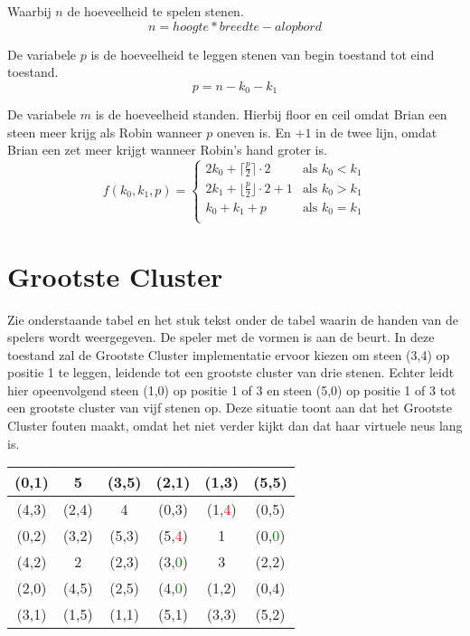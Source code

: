 \documentclass[10pt]{article}
\begin{document}
Waarbij $n$ de hoeveelheid te spelen stenen.
\begin{equation}
    n = hoogte * breedte - alopbord
\end{equation}

De variabele $p$ is de hoeveelheid te leggen stenen van begin toestand tot eind toestand.
\begin{equation}
    p = n - k_0 - k_1
\end{equation}

De variabele $m$ is de hoeveelheid standen. Hierbij floor en ceil omdat Brian een steen meer krijg als Robin wanneer $p$ oneven is. En $+1$ in de twee lijn, omdat Brian een zet meer krijgt wanneer Robin's hand groter is.
\begin{equation}
    f(k_0, k_1, p) = \begin{cases} 
    2k_0 + \lceil \frac{p}{2} \rceil \cdot 2 & \text{als } k_0 < k_1 \\
    2k_1 + \lfloor \frac{p}{2} \rfloor \cdot 2 + 1 & \text{als } k_0 > k_1 \\
    k_0 + k_1 + p & \text{als } k_0 = k_1 \\ 
\end{cases}
\end{equation}

\section{Grootste Cluster}
Zie onderstaande tabel en het stuk tekst onder de tabel waarin de handen van de spelers wordt weergegeven.
De speler met de vormen is aan de beurt.
In deze toestand zal de Grootste Cluster implementatie ervoor kiezen om steen (3,4) op positie 1 te leggen, leidende tot een grootste cluster van drie stenen. 
Echter leidt hier opeenvolgend steen (1,0) op positie 1 of 3 en steen (5,0) op positie 1 of 3 tot een grootste cluster van vijf stenen op.
Deze situatie toont aan dat het Grootste Cluster fouten maakt, omdat het niet verder kijkt dan dat haar virtuele neus lang is.

\FloatBarrier
\begin{tabular}{|c|c|c|c|c|c|}
\hline
(0,1) & 5 & (3,5) & (2,1) & (1,3) & (5,5) \\
\hline
(4,3) & (2,4) & 4 & (0,3) & (1,\textcolor{red}{4}) & (0,5) \\
\hline
(0,2) & (3,2) & (5,3) & (5,\textcolor{red}{4}) & 1 & (0,\textcolor{green}{0}) \\
\hline
(4,2) & 2 & (2,3) & (3,\textcolor{green}{0}) & 3 & (2,2) \\
\hline
(2,0) & (4,5) & (2,5) & (4,\textcolor{green}{0}) & (1,2) & (0,4) \\
\hline
(3,1) & (1,5) & (1,1) & (5,1) & (3,3) & (5,2) \\
\hline
\end{tabular}
\end{document}
